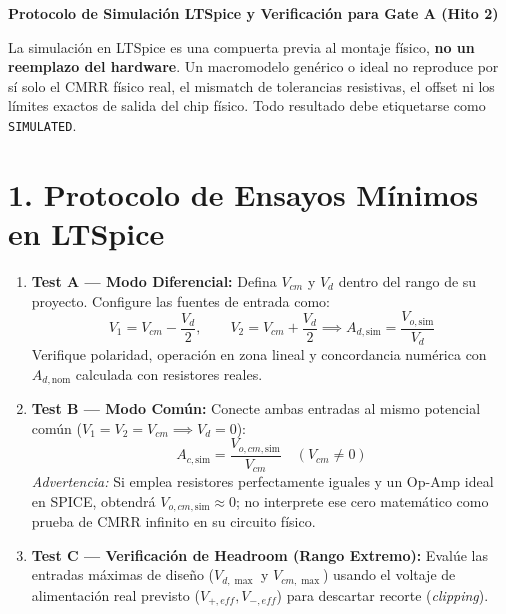 \documentclass[11pt, a4paper]{article}
\begin{document}
\begin{center}
    \Large\textbf{\textcolor{ucbblue}{Protocolo de Simulación LTSpice y Verificación para Gate A (Hito 2)}}
\end{center}

\begin{tcolorbox}[colback=red!5, colframe=red!70!black, title=\textbf{Alcance de la Simulación en Gate A}]
    \raggedright
    La simulación en LTSpice es una compuerta previa al montaje físico, \textbf{no un reemplazo del hardware}. Un macromodelo genérico o ideal no reproduce por sí solo el CMRR físico real, el mismatch de tolerancias resistivas, el offset ni los límites exactos de salida del chip físico. Todo resultado debe etiquetarse como \texttt{SIMULATED}.
\end{tcolorbox}

\section*{1. Protocolo de Ensayos Mínimos en LTSpice}
\begin{enumerate}
    \setlength{\itemsep}{2pt}
    \item \textbf{Test A — Modo Diferencial:} Defina $V_{cm}$ y $V_d$ dentro del rango de su proyecto. Configure las fuentes de entrada como:
    \begin{equation}
        V_1 = V_{cm} - \frac{V_d}{2}, \qquad V_2 = V_{cm} + \frac{V_d}{2} \implies A_{d,\mathrm{sim}} = \frac{V_{o,\mathrm{sim}}}{V_d}
    \end{equation}
    Verifique polaridad, operación en zona lineal y concordancia numérica con $A_{d,\mathrm{nom}}$ calculada con resistores reales.
    \item \textbf{Test B — Modo Común:} Conecte ambas entradas al mismo potencial común ($V_1 = V_2 = V_{cm} \implies V_d = 0$):
    \begin{equation}
        A_{c,\mathrm{sim}} = \frac{V_{o,cm,\mathrm{sim}}}{V_{cm}} \quad (V_{cm} \neq 0)
    \end{equation}
    \textit{Advertencia:} Si emplea resistores perfectamente iguales y un Op-Amp ideal en SPICE, obtendrá $V_{o,cm,\mathrm{sim}} \approx 0$; no interprete ese cero matemático como prueba de CMRR infinito en su circuito físico.
    \item \textbf{Test C — Verificación de Headroom (Rango Extremo):} Evalúe las entradas máximas de diseño ($V_{d,\max}$ y $V_{cm,\max}$) usando el voltaje de alimentación real previsto ($V_{+,eff}, V_{-,eff}$) para descartar recorte (\textit{clipping}).
\end{enumerate}
\end{document}
